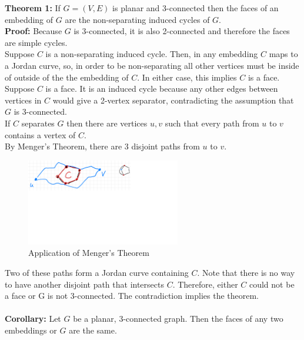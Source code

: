 \documentclass{article}
\begin{document}
\textbf{Theorem 1: }
If $G = (V,E) $ is planar and 3-connected then the faces of an embedding of ${G}$ are the non-separating induced cycles of ${G}$.\\
\textbf{Proof: }
Because ${G}$ is 3-connected, it is also 2-connected and therefore the faces are simple cycles. \\
Suppose ${C}$ is a non-separating induced cycle. Then, in any embedding ${C}$ maps to a Jordan curve, so, in order to be non-separating all other vertices must be inside of outside of the the embedding of ${C}$. In either case, this implies ${C}$ is a face. \\
Suppose ${C}$ is a face. It is an induced cycle because any other edges between vertices in ${C}$ would give a 2-vertex separator, contradicting the assumption that ${G}$ is 3-connected.\\
If ${C}$ separates ${G}$ then there are vertices ${u,v}$ such that every path from ${u}$ to ${v}$ contains a vertex of ${C}$.\\
By Menger's Theorem, there are 3 disjoint paths from ${u}$ to ${v}$.

\begin{figure}[h!]
\centering
\includegraphics[width=0.6\textwidth]{gt2.png}
\caption{Application of Menger's Theorem}
\end{figure}

Two of these paths form a Jordan curve containing ${C}$. Note that there is no way to have another disjoint path that intersects ${C}$. Therefore, either ${C}$ could not be a face or G is not 3-connected. The contradiction implies the theorem. \\
\\
\textbf{Corollary: } Let ${G}$ be a planar, 3-connected graph. Then the faces of any two embeddings or ${G}$ are the same. 
\end{document}
